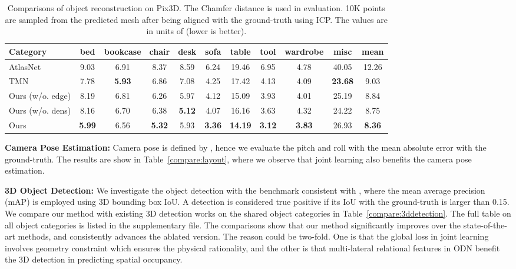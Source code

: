 \documentclass[10pt,twocolumn,letterpaper]{article}
\begin{document}
\begin{table*}[!h]
	\begin{center}
		\begin{tabular}{|l|c c c c c c c c c|c|}
			\hline
			Category & bed & bookcase & chair & desk & sofa & table & tool & wardrobe & misc & mean\\
			\hline\hline
			AtlasNet \cite{groueix2018} & 9.03 & 6.91 & 8.37 & 8.59 & 6.24 & 19.46 & 6.95 & 4.78 & 40.05 & 12.26\\
			TMN \cite{Junyi} & 7.78 & \textbf{5.93} & 6.86 & 7.08 & 4.25 & 17.42 & 4.13 & 4.09 & \textbf{23.68} & 9.03\\
			Ours (w/o. edge) & 8.19 & 6.81 & 6.26 & 5.97 & 4.12 & 15.09 & 3.93 & 4.01 & 25.19 & 8.84\\
			Ours (w/o. dens) & 8.16 & 6.70 & 6.38 & \textbf{5.12} & 4.07 & 16.16 & 3.63 & 4.32 & 24.22 & 8.75\\
			Ours & \textbf{5.99} & 6.56 & \textbf{5.32} & 5.93 & \textbf{3.36} & \textbf{14.19} & \textbf{3.12} & \textbf{3.83} & 26.93 & \textbf{8.36}\\
			\hline
		\end{tabular}
	\end{center}
	\caption{Comparisons of object reconstruction on Pix3D. The Chamfer distance is used in evaluation. 10K points are sampled from the predicted mesh after being aligned with the ground-truth using ICP. The values are in units of  (lower is better).}
	\label{compare:object_recon}
\end{table*}

\noindent \textbf{Camera Pose Estimation:} Camera pose is defined by , hence we evaluate the pitch  and roll  with the mean absolute error with the ground-truth. The results are show in Table~\ref{compare:layout}, where we observe that joint learning also benefits the camera pose estimation.

\noindent \textbf{3D Object Detection:} We investigate the object detection with the benchmark consistent with \cite{huang2018cooperative}, where the mean average precision (mAP) is employed using 3D bounding box IoU. A detection is considered true positive if its IoU with the ground-truth is larger than 0.15. We compare our method with existing 3D detection works \cite{choi2013understanding,huang2018holistic,huang2018cooperative} on the shared object categories in Table~\ref{compare:3ddetection}. The full table on all object categories is listed in the supplementary file. The comparisons show that our method significantly improves over the state-of-the-art methods, and consistently advances the ablated version. The reason could be two-fold. One is that the global loss  in joint learning involves geometry constraint which ensures the physical rationality, and the other is that multi-lateral relational features in ODN benefit the 3D detection in predicting spatial occupancy.
\end{document}
